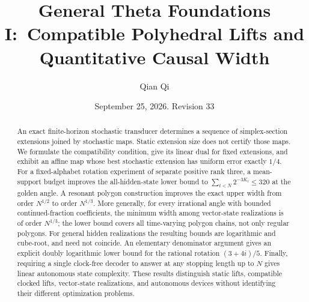\documentclass[11pt]{amsart}
\title[Compatible lifts and causal width]{General Theta Foundations I:\
Compatible Polyhedral Lifts and Quantitative Causal Width}
\author{Qian Qi}
\date{September 25, 2026. Revision 33}
\theoremstyle{definition}\newtheorem{definition}[theorem]{Definition}
\theoremstyle{remark}\newtheorem{remark}[theorem]{Remark}
\begin{document}
\begin{abstract}
An exact finite-horizon stochastic transducer determines a sequence of
simplex-section extensions joined by stochastic maps. Static extension
size does not certify those maps. We formulate the compatibility condition,
give its linear dual for fixed extensions, and exhibit an affine map whose
best stochastic extension has uniform error exactly $1/4$.
For a fixed-alphabet rotation experiment of separate positive rank three,
a mean-support budget improves the all-hidden-state lower bound to
$\sum_{t<N}2^{-3K_t}\le320$ at the golden angle. A resonant polygon
construction improves the exact upper width from order $N^{1/2}$ to
order $N^{1/3}$. More generally, for every irrational angle with bounded
continued-fraction coefficients, the minimum width among vector-state
realizations is of order $N^{1/3}$; the lower bound covers all time-varying
polygon chains, not only regular polygons. For general hidden realizations
the resulting bounds are logarithmic and cube-root, and need not coincide.
An elementary denominator argument gives an explicit doubly logarithmic
lower bound for the rational rotation $(3+4i)/5$. Finally, requiring a single
clock-free decoder to answer at any stopping length up to $N$ gives linear
autonomous state complexity. These results distinguish static lifts,
compatible clocked lifts, vector-state realizations, and autonomous devices
without identifying their different optimization problems.
\end{abstract}
\maketitle









\end{document}
